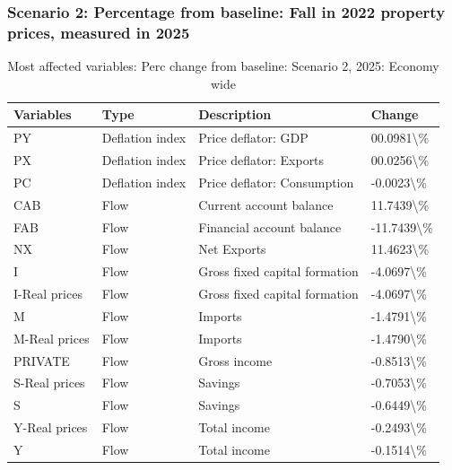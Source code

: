 \documentclass[
]{book}
\begin{document}
\hypertarget{scenario-2-percentage-from-baseline-fall-in-2022-property-prices-measured-in-2025}{%
\subsubsection{Scenario 2: Percentage from baseline: Fall in 2022 property prices, measured in 2025}\label{scenario-2-percentage-from-baseline-fall-in-2022-property-prices-measured-in-2025}}

\begin{table}

\caption{\label{tab:most-affected-scenario-2-perc-2025-economy}Most affected variables: Perc change from baseline: Scenario 2, 2025: Economy wide}
\centering
\fontsize{10}{12}\selectfont
\begin{tabular}[t]{l|l|l|l}
\hline
Variables & Type & Description & Change\\
\hline
PY & Deflation index & Price deflator: GDP & 00.0981\textbackslash{}\%\\
\hline
PX & Deflation index & Price deflator: Exports & 00.0256\textbackslash{}\%\\
\hline
PC & Deflation index & Price deflator: Consumption & -0.0023\textbackslash{}\%\\
\hline
CAB & Flow & Current account balance & 11.7439\textbackslash{}\%\\
\hline
FAB & Flow & Financial account balance & -11.7439\textbackslash{}\%\\
\hline
NX & Flow & Net Exports & 11.4623\textbackslash{}\%\\
\hline
I & Flow & Gross fixed capital formation & -4.0697\textbackslash{}\%\\
\hline
I-Real prices & Flow & Gross fixed capital formation & -4.0697\textbackslash{}\%\\
\hline
M & Flow & Imports & -1.4791\textbackslash{}\%\\
\hline
M-Real prices & Flow & Imports & -1.4790\textbackslash{}\%\\
\hline
PRIVATE & Flow & Gross income & -0.8513\textbackslash{}\%\\
\hline
S-Real prices & Flow & Savings & -0.7053\textbackslash{}\%\\
\hline
S & Flow & Savings & -0.6449\textbackslash{}\%\\
\hline
Y-Real prices & Flow & Total income & -0.2493\textbackslash{}\%\\
\hline
Y & Flow & Total income & -0.1514\textbackslash{}\%\\

\end{tabular}
\end{table}
\end{document}
